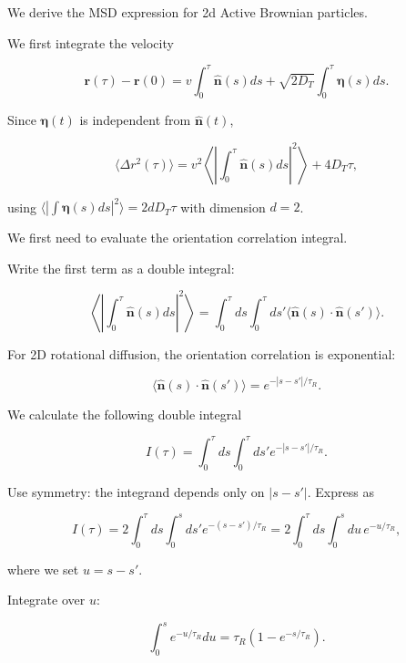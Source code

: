 \documentclass[
  letterpaper,
  enabledeprecatedfontcommands]{report}
\begin{document}
\begin{tcolorbox}[enhanced jigsaw, toprule=.15mm, opacityback=0, colbacktitle=quarto-callout-note-color!10!white, title=\textcolor{quarto-callout-note-color}{\faInfo}\hspace{0.5em}{Note}, leftrule=.75mm, rightrule=.15mm, bottomtitle=1mm, breakable, colframe=quarto-callout-note-color-frame, colback=white, toptitle=1mm, left=2mm, titlerule=0mm, coltitle=black, arc=.35mm, bottomrule=.15mm, opacitybacktitle=0.6]

We derive the MSD expression for 2d Active Brownian particles.

We first integrate the velocity

\[
\mathbf{r}(\tau) - \mathbf{r}(0) = v \int_0^\tau \hat{\mathbf{n}}(s) ds + \sqrt{2 D_T} \int_0^\tau \boldsymbol{\eta}(s) ds.
\]

Since \(\boldsymbol{\eta}(t)\) is independent from
\(\hat{\mathbf{n}}(t)\),

\[
\langle \Delta r^2(\tau) \rangle = v^2 \left\langle \left| \int_0^\tau \hat{\mathbf{n}}(s) ds \right|^2 \right\rangle + 4 D_T \tau,
\]

using
\(\langle |\int \boldsymbol{\eta}(s) ds|^2 \rangle = 2 d D_T \tau\) with
dimension \(d=2\).

We first need to evaluate the orientation correlation integral.

Write the first term as a double integral:

\[
\left\langle \left| \int_0^\tau \hat{\mathbf{n}}(s) ds \right|^2 \right\rangle = \int_0^\tau ds \int_0^\tau ds' \langle \hat{\mathbf{n}}(s) \cdot \hat{\mathbf{n}}(s') \rangle.
\]

For 2D rotational diffusion, the orientation correlation is exponential:

\[
\langle \hat{\mathbf{n}}(s) \cdot \hat{\mathbf{n}}(s') \rangle = e^{-|s - s'|/\tau_R}.
\]

We calculate the following double integral

\[
I(\tau) = \int_0^\tau ds \int_0^\tau ds' e^{-|s - s'|/\tau_R}.
\]

Use symmetry: the integrand depends only on \(|s - s'|\). Express as

\[
I(\tau) = 2 \int_0^\tau ds \int_0^s ds' e^{-(s - s')/\tau_R} = 2 \int_0^\tau ds \int_0^s du\, e^{-u/\tau_R},
\]

where we set \(u = s - s'\).

Integrate over \(u\):

\[
\int_0^s e^{-u/\tau_R} du = \tau_R \left(1 - e^{-s/\tau_R}\right).
\]


\end{tcolorbox}
\end{document}
